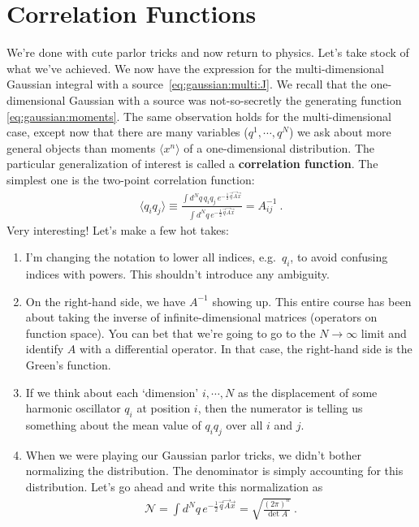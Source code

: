 \section{Correlation Functions}

We're done with cute parlor tricks and now return to physics. Let's take stock of what we've achieved. We now have the expression for the multi-dimensional Gaussian integral with a source~\eqref{eq:gaussian:multi:J}. We recall that the one-dimensional Gaussian with a source was not-so-secretly the generating function \eqref{eq:gaussian:moments}. The same observation holds for the multi-dimensional case, except now that there are many variables ($q^1, \cdots, q^N$) we ask about more general objects than moments $\langle x^n\rangle$ of a one-dimensional distribution. The particular generalization of interest is called a \textbf{correlation function}. The simplest one is the two-point correlation function:
\begin{align}
	\langle q_i q_j \rangle
	\equiv
	\frac{
		\int d^Nq\, q_iq_j\, e^{-\frac{1}{2} \vec{q}\vec{A}\vec{x}} 
		}{
		\int d^Nq\, e^{-\frac{1}{2} \vec{q}\vec{A}\vec{x}}
		}
	= A^{-1}_{ij} \ .
	\label{eq:multi:Gaussian:2:point}
\end{align}
Very interesting! Let's make a few hot takes:
\begin{enumerate}
\item I'm changing the notation to lower all indices, e.g.~$q_i$, to avoid confusing indices with powers. This shouldn't introduce any ambiguity.
\item On the right-hand side, we have $A^{-1}$ showing up. This entire course has been about taking the inverse of infinite-dimensional matrices (operators on function space). You can bet that we're going to go to the $N\to\infty$ limit and identify $A$ with a differential operator. In that case, the right-hand side is the Green's function. 
\item If we think about each `dimension' $i, \cdots, N$ as the displacement of some harmonic oscillator $q_i$ at position $i$, then the numerator is telling us something about the mean value of $q_iq_j$ over all $i$ and $j$. 
\item When we were playing our Gaussian parlor tricks, we didn't bother normalizing the distribution. The denominator is simply accounting for this distribution. Let's go ahead and write this normalization as
\begin{align}
	\mathcal N 
	= \int d^Nq\, e^{-\frac{1}{2} \vec{q}\vec{A}\vec{x}} 
	= \sqrt{\frac{(2\pi)^n}{\det A}}  
	\ .
\end{align}
\end{enumerate}
